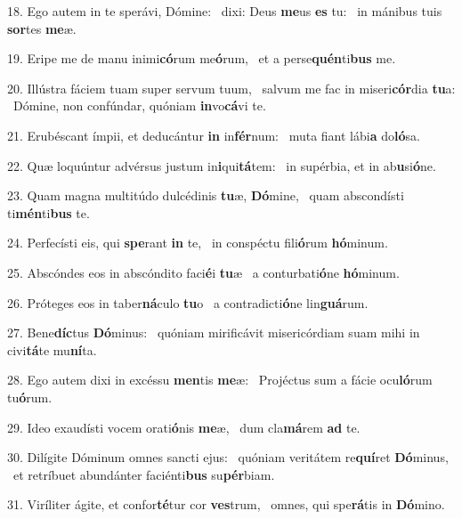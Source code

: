 18. Ego autem in te sperávi, Dómine: \dag\  dixi: Deus \textbf{me}us \textbf{es} tu: \ast\  in mánibus tuis \textbf{sor}tes \textbf{me}æ.\

19. Eripe me de manu inimi\textbf{có}rum me\textbf{ó}rum, \ast\  et a perse\textbf{quén}ti\textbf{bus} me.\

20. Illústra fáciem tuam super servum tuum, \dag\  salvum me fac in miseri\textbf{cór}dia \textbf{tu}a: \ast\  Dómine, non confúndar, quóniam \textbf{in}vo\textbf{cá}vi te.\

21. Erubéscant ímpii, et deducántur \textbf{in} in\textbf{fér}num: \ast\  muta fiant lábi\textbf{a} do\textbf{ló}sa.\

22. Quæ loquúntur advérsus justum in\textbf{i}qui\textbf{tá}tem: \ast\  in supérbia, et in ab\textbf{u}si\textbf{ó}ne.\

23. Quam magna multitúdo dulcédinis \textbf{tu}æ, \textbf{Dó}mine, \ast\  quam abscondísti ti\textbf{mén}ti\textbf{bus} te.\

24. Perfecísti eis, qui \textbf{spe}rant \textbf{in} te, \ast\  in conspéctu fili\textbf{ó}rum \textbf{hó}minum.\

25. Abscóndes eos in abscóndito faci\textbf{é}i \textbf{tu}æ \ast\  a conturbati\textbf{ó}ne \textbf{hó}minum.\

26. Próteges eos in taber\textbf{ná}culo \textbf{tu}o \ast\  a contradicti\textbf{ó}ne lin\textbf{guá}rum.\

27. Bene\textbf{díc}tus \textbf{Dó}minus: \ast\  quóniam mirificávit misericórdiam suam mihi in civi\textbf{tá}te mu\textbf{ní}ta.\

28. Ego autem dixi in excéssu \textbf{men}tis \textbf{me}æ: \ast\  Projéctus sum a fácie ocu\textbf{ló}rum tu\textbf{ó}rum.\

29. Ideo exaudísti vocem orati\textbf{ó}nis \textbf{me}æ, \ast\  dum cla\textbf{má}rem \textbf{ad} te.\

30. Dilígite Dóminum omnes sancti ejus: \dag\  quóniam veritátem re\textbf{quí}ret \textbf{Dó}minus, \ast\  et retríbuet abundánter faciénti\textbf{bus} su\textbf{pér}biam.\

31. Viríliter ágite, et confor\textbf{té}tur cor \textbf{ves}trum, \ast\  omnes, qui spe\textbf{rá}tis in \textbf{Dó}mino.\


